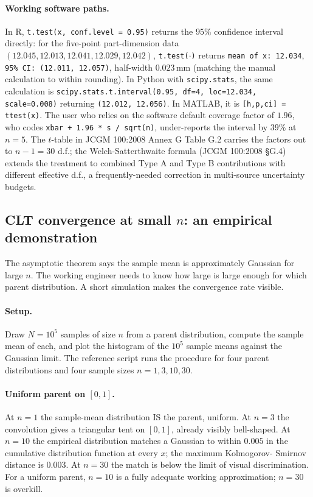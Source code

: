 \paragraph{Working software paths.} In R, \texttt{t.test(x,
conf.level = 0.95)} returns the $95\%$ confidence interval
directly: for the five-point part-dimension data
$(12.045, 12.013, 12.041, 12.029, 12.042)$,
\texttt{t.test(}$\cdot$\texttt{)} returns
\texttt{mean of x: 12.034}, \texttt{95\% CI: (12.011, 12.057)},
half-width $0.023\,\si{\milli\meter}$ (matching the manual
calculation to within rounding). In Python with
\texttt{scipy.stats}, the same calculation is
\texttt{scipy.stats.t.interval(0.95, df=4, loc=12.034,
scale=0.008)} returning \texttt{(12.012, 12.056)}. In MATLAB, it
is \texttt{[h,p,ci] = ttest(x)}. The user who relies on the
software default coverage factor of $1.96$, who codes
\texttt{xbar + 1.96 * s / sqrt(n)}, under-reports the interval
by $39\%$ at $n = 5$. The $t$-table in JCGM 100:2008 Annex G
Table G.2 carries the factors out to $n - 1 = 30$ d.f.; the
Welch-Satterthwaite formula (JCGM 100:2008 \S G.4) extends the
treatment to combined Type A and Type B contributions with
different effective d.f., a frequently-needed correction in
multi-source uncertainty budgets.

\subsection{CLT convergence at small $n$: an empirical demonstration}

The asymptotic theorem says the sample mean is approximately
Gaussian for large $n$. The working engineer needs to know how
large is large enough for which parent distribution. A short
simulation makes the convergence rate visible.

\paragraph{Setup.} Draw $N = 10^{5}$ samples of size $n$ from
a parent distribution, compute the sample mean of each, and
plot the histogram of the $10^{5}$ sample means against the
Gaussian limit. The reference script
runs the procedure for four parent distributions and four
sample sizes $n = 1, 3, 10, 30$.

\paragraph{Uniform parent on $[0, 1]$.} At $n = 1$ the
sample-mean distribution IS the parent, uniform. At $n = 3$
the convolution gives a triangular tent on $[0, 1]$, already
visibly bell-shaped. At $n = 10$ the empirical distribution
matches a Gaussian to within $0.005$ in the cumulative
distribution function at every $x$; the maximum Kolmogorov-
Smirnov distance is $0.003$. At $n = 30$ the match is below
the limit of visual discrimination. For a uniform parent,
$n = 10$ is a fully adequate working approximation; $n = 30$
is overkill.

